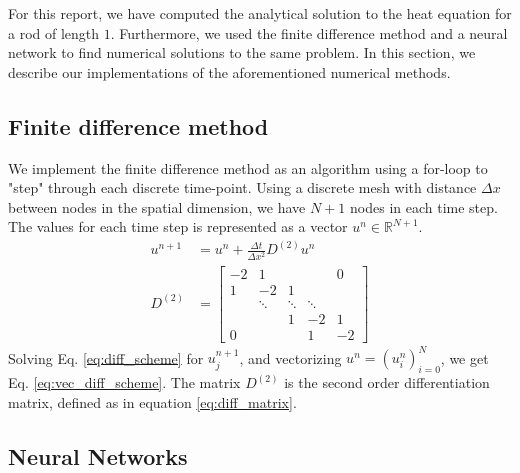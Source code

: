 For this report, we have computed the analytical solution to the heat equation for a rod of length $1$. 
Furthermore, we used the finite difference method and a neural network to find numerical solutions to the same problem. 
In this section, we describe our implementations of the aforementioned numerical methods. 

\subsection{Finite difference method}

We implement the finite difference method as an algorithm using a for-loop to "step" through each discrete time-point.
Using a discrete mesh with distance $\Delta x$ between nodes in the spatial dimension,
we have $N+1$ nodes in each time step.
The values for each time step is represented as a vector $u^n \in \mathbb{R}^{N+1}$.
\begin{align}
    \label{eq:vec_diff_scheme}
    u^{n+1} &= u^n + \frac{\Delta t}{\Delta x^2} D^{(2)}u^n \\
    \label{eq:diff_matrix}
    D^{(2)} &= 
    \begin{bmatrix}
    -2  & 1     &       &        &   0    \\
     1 & -2 & 1 &  &        \\
     & \ddots & \ddots & \ddots & \\
      &     & 1 & -2 & 1 \\
     0&           &      & 1     & -2
    \end{bmatrix}
\end{align}
Solving Eq. \ref{eq:diff_scheme} for $u_j^{n+1}$, and vectorizing $u^n = (u^n_i)_{i=0}^N$, we get Eq. \ref{eq:vec_diff_scheme}.
The matrix $D^{(2)}$ is the second order differentiation matrix, defined as in equation \ref{eq:diff_matrix}.

\subsection{Neural Networks}

